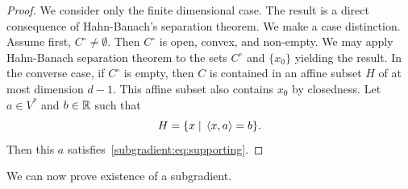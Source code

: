 \begin{proof}
    We consider only the finite dimensional case.
    The result is a direct consequence of Hahn-Banach's separation theorem. We make a case distinction. Assume first, $C^\circ\neq \emptyset$. Then $C^\circ$ is open, convex, and non-empty. We may apply Hahn-Banach separation theorem to the sets $C^\circ$ and $\{x_0\}$ yielding the result. In the converse case, if $C^\circ$ is empty, then $C$ is contained in an affine subset $H$ of at most dimension $d-1$. This affine subset also contains $x_0$ by closedness. Let $a\in V^*$ and $b\in \mathbb{R}$ such that 
    \[
        H=\{x\;|\; \left\langle x , a\right\rangle = b\}.
    \]
    Then this $a$ satisfies~\eqref{subgradient:eq:supporting}.
\end{proof}

We can now prove existence of a subgradient.

